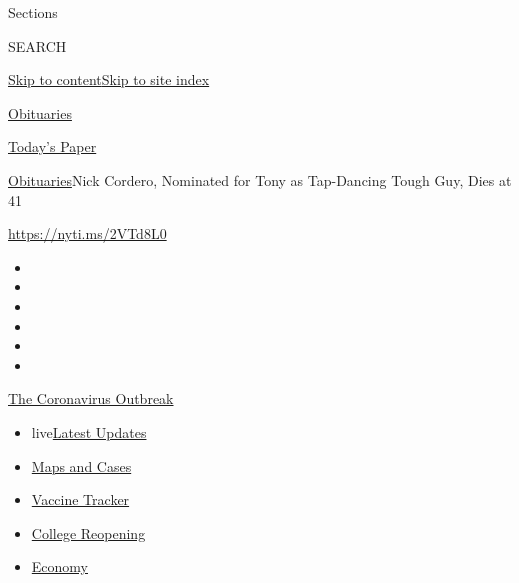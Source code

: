 Sections

SEARCH

\protect\hyperlink{site-content}{Skip to
content}\protect\hyperlink{site-index}{Skip to site index}

\href{https://www.nytimes3xbfgragh.onion/section/obituaries}{Obituaries}

\href{https://myaccount.nytimes3xbfgragh.onion/auth/login?response_type=cookie\&client_id=vi}{}

\href{https://www.nytimes3xbfgragh.onion/section/todayspaper}{Today's
Paper}

\href{/section/obituaries}{Obituaries}\textbar{}Nick Cordero, Nominated
for Tony as Tap-Dancing Tough Guy, Dies at 41

\url{https://nyti.ms/2VTd8L0}

\begin{itemize}
\item
\item
\item
\item
\item
\item
\end{itemize}

\href{https://www.nytimes3xbfgragh.onion/news-event/coronavirus?action=click\&pgtype=Article\&state=default\&region=TOP_BANNER\&context=storylines_menu}{The
Coronavirus Outbreak}

\begin{itemize}
\tightlist
\item
  live\href{https://www.nytimes3xbfgragh.onion/2020/08/04/world/coronavirus-covid-19.html?action=click\&pgtype=Article\&state=default\&region=TOP_BANNER\&context=storylines_menu}{Latest
  Updates}
\item
  \href{https://www.nytimes3xbfgragh.onion/interactive/2020/us/coronavirus-us-cases.html?action=click\&pgtype=Article\&state=default\&region=TOP_BANNER\&context=storylines_menu}{Maps
  and Cases}
\item
  \href{https://www.nytimes3xbfgragh.onion/interactive/2020/science/coronavirus-vaccine-tracker.html?action=click\&pgtype=Article\&state=default\&region=TOP_BANNER\&context=storylines_menu}{Vaccine
  Tracker}
\item
  \href{https://www.nytimes3xbfgragh.onion/2020/08/02/us/covid-college-reopening.html?action=click\&pgtype=Article\&state=default\&region=TOP_BANNER\&context=storylines_menu}{College
  Reopening}
\item
  \href{https://www.nytimes3xbfgragh.onion/live/2020/08/03/business/stock-market-today-coronavirus?action=click\&pgtype=Article\&state=default\&region=TOP_BANNER\&context=storylines_menu}{Economy}
\end{itemize}

